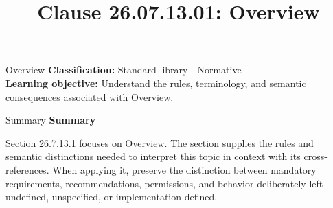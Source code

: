 \documentclass[10pt,letterpaper]{article}
\title{Clause 26.07.13.01: Overview}
\author{}
\date{}
\begin{document}
\maketitle
\begin{CornellOverviewBox}{Overview}
\textbf{Classification:} Standard library - Normative\\[2pt]
\textbf{Learning objective:} Understand the rules, terminology, and semantic consequences associated with Overview.
\end{CornellOverviewBox}\begin{CornellSummaryBox}{Summary}
{\sffamily\bfseries\color{Accent} Summary}\par\vspace{3pt}Section 26.7.13.1 focuses on Overview. The section supplies the rules and semantic distinctions needed to interpret this topic in context with its cross-references. When applying it, preserve the distinction between mandatory requirements, recommendations, permissions, and behavior deliberately left undefined, unspecified, or implementation-defined.
\end{CornellSummaryBox}
\end{document}
